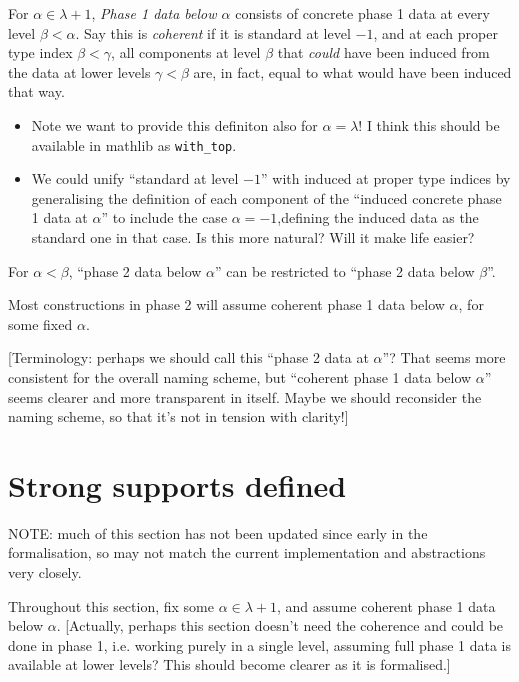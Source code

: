 \begin{definition}
  \label{def:coherent-phase-1-data}
  For $\alpha \in \lambda + 1$, \emph{Phase 1 data below $\alpha$} consists of concrete phase 1 data at every level $\beta < \alpha$.  Say this is \emph{coherent} if it is standard at level $-1$, and at each proper type index $\beta < \gamma$, all components at level $\beta$ that \emph{could} have been induced from the data at lower levels $\gamma < \beta$ are, in fact, equal to what would have been induced that way.

  \begin{itemize}
  \item Note we want to provide this definiton also for $\alpha = \lambda$!  I think this should be available in mathlib as \verb|with_top|.
  \item We could unify “standard at level $-1$” with induced at proper type indices by generalising the definition of each component of the “induced concrete phase 1 data at $\alpha$” to include the case $\alpha = -1$,defining the induced data as the standard one in that case.  Is this more natural?  Will it make life easier?
  \end{itemize}

  For $\alpha < \beta$, “phase 2 data below $\alpha$” can be restricted to “phase 2 data below $\beta$”.

  Most constructions in phase 2 will assume coherent phase 1 data below $\alpha$, for some fixed $\alpha$.

  [Terminology: perhaps we should call this “phase 2 data at $\alpha$”?  That seems more consistent for the overall naming scheme, but “coherent phase 1 data below $\alpha$” seems clearer and more transparent in itself.  Maybe we should reconsider the naming scheme, so that it’s not in tension with clarity!]
\end{definition}

\section{Strong supports defined}

NOTE: much of this section has not been updated since early in the formalisation, so may not match the current implementation and abstractions very closely.

Throughout this section, fix some $\alpha \in \lambda + 1$, and assume coherent phase 1 data below $\alpha$. [Actually, perhaps this section doesn’t need the coherence and could be done in phase 1, i.e. working purely in a single level, assuming full phase 1 data is available at lower levels?  This should become clearer as it is formalised.]

